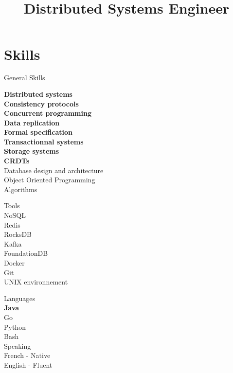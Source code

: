 \documentclass[10pt,a4paper,sans]{moderncv}        %
\title{Distributed Systems Engineer}
\begin{document}
\makecvtitle

\vspace{-1cm}

\section{Skills}
\closesection{}


\begin{multicols}{3}
    {\large \color{color1} General Skills}

    \textbf{Distributed systems}\\
    \textbf{Consistency protocols}\\
    \textbf{Concurrent programming}\\
    \textbf{Data replication}\\
    \textbf{Formal specification}\\
    \textbf{Transactionnal systems}\\
    \textbf{Storage systems}\\
    \textbf{CRDTs}\\
    Database design and architecture\\
    Object Oriented Programming\\
    Algorithms\\


\vfill\null\columnbreak


{\large \color{color1}  Tools} \\
    NoSQL\\
    Redis\\
    RocksDB\\
    Kafka\\
    FoundationDB\\
    Docker\\ 
    Git\\ 
    UNIX environnement\\ 

\vfill\null\columnbreak

{\large \color{color1}  Languages}\\
\textbf{Java}\\ 
Go\\
Python\\
Bash\\ 


{\large \color{color1} Speaking}\\
    French - Native\\
    English - Fluent\\

\vfill\null\columnbreak

\end{multicols}
\end{document}
